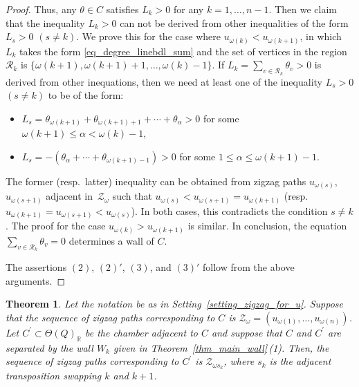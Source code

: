 \documentclass[pdftex]{sigma}
\numberwithin{equation}{section}
\newtheorem{Theorem}{Theorem}[section]
\theoremstyle{definition}
\newcommand{\RR}{\mathbb{R}}
\newcommand{\calR}{\mathcal{R}}
\newcommand{\calZ}{\mathcal{Z}}
\newcommand{\permII}{\omega}
\begin{document}
\begin{proof}
Thus, any $\theta\in C$ satisfies $L_k>0$ for any $k=1, \dots, n-1$.
Then we claim that the inequality $L_k>0$ can not be derived from other inequalities of the form $L_s>0$ $(s\neq k)$.
We prove this for the case where $u_{\permII(k)}<u_{\permII(k+1)}$, in which $L_k$ takes the form \eqref{eq_degree_linebdl_sum} and the set of vertices in the region $\calR_k$ is
$\{\permII(k+1), \permII(k+1)+1, \dots, \permII(k)-1\}$.
If $L_k=\sum_{v\in\calR_k}\theta_v>0$ is derived from other inequations, then we need at least one of the inequality $L_s>0$ $(s\neq k)$ to be of the form:
\begin{itemize}\itemsep=0pt
\item $L_s=\theta_{\permII(k+1)}+\theta_{\permII(k+1)+1}+\cdots+\theta_\alpha>0$ for some $\permII(k+1)\le \alpha<\permII(k)-1$,
\item $L_s=-(\theta_\alpha+\cdots+\theta_{\permII(k+1)-1})>0$ for some $1\leq \alpha\leq \permII(k+1)-1$.
\end{itemize}
The former (resp.\ latter) inequality can be obtained from zigzag paths $u_{\permII(s)}$, $u_{\permII(s+1)}$ adjacent in~$\calZ_\permII$ such that
$u_{\permII(s)}<u_{\permII(s+1)}=u_{\permII(k+1)}$ (resp.\ $u_{\permII(k+1)}=u_{\permII(s+1)}<u_{\permII(s)}$).
In both cases, this contradicts the condition $s\neq k$. The proof for the case $u_{\permII(k)}>u_{\permII(k+1)}$ is similar.
In conclusion, the equation $\sum_{v\in\calR_k}\theta_v=0$ determines a wall of $C$.

The assertions $(2)$, $(2)'$, $(3)$, and $(3)'$ follow from the above arguments.
\end{proof}

\begin{Theorem}\label{thm_adjacentchamber_reflection}
Let the notation be as in Setting~{\rm \ref{setting_zigzag_for_u}}.
Suppose that the sequence of zigzag paths corresponding to $C$ is $\calZ_\permII=(u_{\permII(1)}, \dots, u_{\permII(n)})$.
Let $C^\prime\subset \Theta(Q)_\RR$ be the chamber adjacent to $C$ and suppose that $C$ and $C^\prime$ are separated by the wall $W_k$ given in Theorem~{\rm \ref{thm_main_wall}\,(1)}.
Then, the sequence of zigzag paths corresponding to $C^\prime$ is $\calZ_{\permII s_k}$, where $s_k$ is the adjacent transposition swapping $k$ and $k+1$.
\end{Theorem}
\end{document}

